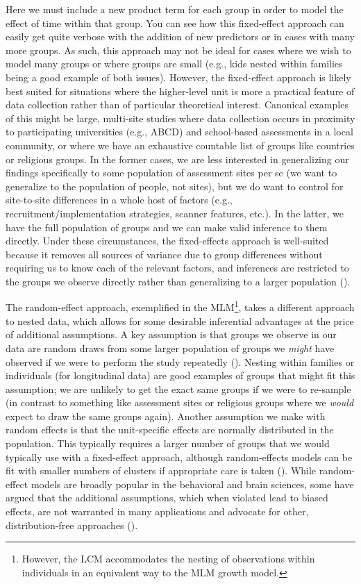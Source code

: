 \documentclass[11pt]{article}
\begin{document}
%
Here we must include a new product term for each group in order to model the effect of time within that group. You can see how this fixed-effect approach can easily get quite verbose with the addition of new predictors or in cases with many more groups. As such, this approach may not be ideal for cases where we wish to model many groups or where groups are small (e.g., kids nested within families being a good example of both issues). However, the fixed-effect approach is likely best suited for situations where the higher-level unit is more a practical feature of data collection rather than of particular theoretical interest. Canonical examples of this might be large, multi-site studies where data collection occurs in proximity to participating universities (e.g., ABCD) and school-based assessments in a local community, or where we have an exhaustive countable list of groups like countries or religious groups. In the former cases, we are less interested in generalizing our findings specifically to some population of assessment sites per se (we want to generalize to the population of people, not sites), but we do want to control for site-to-site differences in a whole host of factors (e.g., recruitment/implementation strategies, scanner features, etc.). In the latter, we have the full population of groups and we can make valid inference to them directly. Under these circumstances, the fixed-effects approach is well-suited because it removes all sources of variance due to group differences without requiring us to know each of the relevant factors, and inferences are restricted to the groups we observe directly rather than generalizing to a larger population (\cite{mcneish_fixed_2019}).

The random-effect approach, exemplified in the MLM\footnote{However, the LCM accommodates the nesting of observations within individuals in an equivalent way to the MLM growth model.}, takes a different approach to nested data, which allows for some desirable inferential advantages at the price of additional assumptions. A key assumption is that groups we observe in our data are random draws from some larger population of groups we \textit{might} have observed if we were to perform the study repeatedly (\cite{mcneish_unnecessary_2017}). Nesting within families or individuals (for longitudinal data) are good examples of groups that might fit this assumption; we are unlikely to get the exact same groups if we were to re-sample (in contrast to something like assessment sites or religious groups where we \textit{would} expect to draw the same groups again). Another assumption we make with random effects is that the unit-specific effects are normally distributed in the population. This typically requires a larger number of groups that we would typically use with a fixed-effect approach, although random-effects models can be fit with smaller numbers of clusters if appropriate care is taken (\cite{mcneish_modeling_2016}). While random-effect models are broadly popular in the behavioral and brain sciences, some have argued that the additional assumptions, which when violated lead to biased effects, are not warranted in many applications and advocate for other, distribution-free approaches (\cite{mcneish_unnecessary_2017}).
\end{document}
